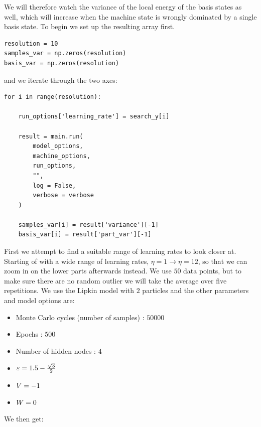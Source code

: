 We will therefore watch the variance of the local energy of the basis states as well, which will increase when the machine state is wrongly dominated by a single basis state. To begin we set up the resulting array first.

\begin{verbatim}
resolution = 10
samples_var = np.zeros(resolution)
basis_var = np.zeros(resolution)
\end{verbatim}

and we iterate through the two axes:

\begin{verbatim}
for i in range(resolution):
        
    run_options['learning_rate'] = search_y[i]

    result = main.run(
        model_options,
        machine_options,
        run_options,
        "",
        log = False,
        verbose = verbose
    )
    
    samples_var[i] = result['variance'][-1]
    basis_var[i] = result['part_var'][-1]
\end{verbatim}

First we attempt to find a suitable range of learning rates to look closer at. Starting of with a wide range of learning rates, $\eta =1 \rightarrow \eta = 12$, so that we can zoom in on the lower parts afterwards instead.  We use $50$ data points, but to make sure there are no random outlier we will take the average over five repetitions. We use the Lipkin model with $2$ particles and the other parameters and model options are:

\begin{itemize}
  \item Monte Carlo cycles (number of samples) : $50 000$
  \item Epochs : $500$
  \item Number of hidden nodes : $4$
  \item $\varepsilon = 1.5 - \frac{\sqrt{3}}{2}$
  \item $V = -1$
  \item $W = 0$
\end{itemize}

We then get:

